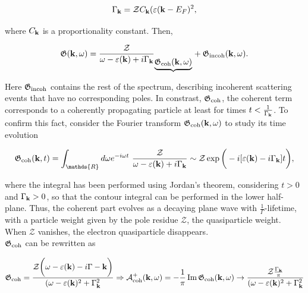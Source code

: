 $$
    \Gamma_{{\bf k}} = \mathcal{Z} C_{{\bf k}} (\varepsilon({\bf k} - E_F)^2,
$$

where $C_{{\bf k}}$ is a proportionality constant. Then,

\begin{equation}
\mathfrak{G}({\bf k}, \omega) = {\frac{\mathcal{Z}}{\omega - \varepsilon({\bf k}) + i \Gamma_{{\bf k}}}}_{\underbrace{\mathfrak{G}_{\textnormal{coh}}({\bf k}, \omega)}} + \mathfrak{G}_{\textnormal{incoh}}({\bf k}, \omega).
\end{equation}

Here $\mathfrak{G}_{\textnormal{incoh}}$ contains the rest of the spectrum, describing incoherent scattering events that have no corresponding poles. In constrast, $\mathfrak{G}_{\textnormal{coh}}$, the coherent term corresponds to a coherently propagating particle at least for times $t < \frac{1}{\Gamma_{{\bf k}}}$. To confirm this fact, consider the Fourier transform $\mathfrak{G}_{\textnormal{coh}}({\bf k}, \omega)$ to study its time evolution

\begin{equation}
    {\mathfrak{G}_{\textnormal{coh}}({\bf k}, t)} = \int_{\mathds{R}} d\omega e^{-i\omega t} \blanky {\frac{\mathcal{Z}}{\omega - \varepsilon({\bf k}) + i \Gamma_{{\bf k}}}} \sim \mathcal{Z} \exp \bigg(-i[\varepsilon({\bf k}) - i \Gamma_{\bf k}] t\bigg),
\end{equation}

where the integral has been performed using Jordan's theorem, considering $t > 0$ and $\Gamma_{{\bf k}} > 0$, so that the contour integral can be performed in the lower half-plane. Thus, the coherent part evolves as a decaying plane wave with $\frac{1}{\Gamma}$-lifetime, with a particle weight given by the pole residue $\mathcal{Z}$, the quasiparticle weight. When $\mathcal{Z}$ vanishes, the electron quasiparticle disappears. \\

 $\mathfrak{G}_{\textnormal{coh}}$ can be rewritten as 
 
\begin{equation} \begin{split}
    \mathfrak{G}_{\textnormal{coh}} = \frac{\mathcal{Z}\bigg(\omega - \varepsilon({\bf k}) - i \Gamma-{{\bf k}}\bigg)}{(\omega - \varepsilon({\bf k})^2 + \Gamma_{{\bf k}}^2} \Rightarrow \mathcal{A}^{+}_{\textnormal{coh}}({\bf k}, \omega) = - \frac{1}{\pi} \Im \mathfrak{G}_{\textnormal{coh}}({\bf k}, \omega) \rightarrow \frac{\mathcal{
   Z} \frac{\Gamma_{{\bf k}}}{\pi}}{(\omega - \varepsilon({\bf k})^2 + \Gamma_{{\bf k}}^2}
   \label{Fermi_liquids_valid_approx}
\end{split}
\end{equation}

